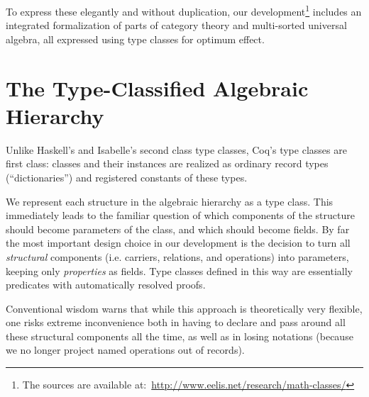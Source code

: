 \documentclass{llncs}
\begin{document}
To express these elegantly and without duplication, our development\footnote{The sources are available
at:~\url{http://www.eelis.net/research/math-classes/}} includes an integrated formalization of parts of category theory and multi-sorted universal algebra, all expressed using type classes for optimum effect.


\section{The Type-Classified Algebraic Hierarchy}\label{classes}

Unlike Haskell's and Isabelle's second class type classes, Coq's type classes are first class: classes and their instances are realized as ordinary record types (``dictionaries'') and registered constants of these types.

We represent each structure in the algebraic hierarchy as a type class. This immediately leads to the familiar question of which components of the structure should become parameters of the class, and which should become fields. By far the most important design choice in our development is the decision to turn all \emph{structural} components (i.e. carriers, relations, and operations) into parameters, keeping only \emph{properties} as fields. Type classes defined in this way are essentially predicates with automatically resolved proofs.

Conventional wisdom warns that while this approach is theoretically very flexible, one risks extreme inconvenience both in having to declare and pass around all these structural components all the time, as well as in losing notations (because we no longer project named operations out of records).
\end{document}
